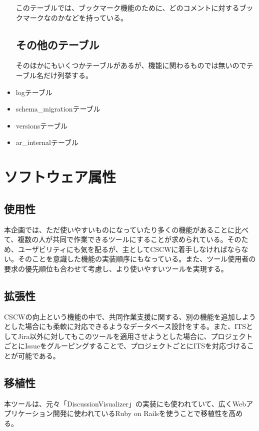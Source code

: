 \documentclass[12pt, oneside]{jreport}
\begin{document}
\begin{itemize}
		このテーブルでは、ブックマーク機能のために、どのコメントに対するブックマークなのかなどを持っている。
		
		\subsection{その他のテーブル}
		
		そのほかにもいくつかテーブルがあるが、機能に関わるものでは無いのでテーブル名だけ列挙する。
		
		\item logテーブル
		\item schema\_migrationテーブル
		\item versionsテーブル
		\item ar\_internalテーブル
		
	\end{itemize}
	
	\section{ソフトウェア属性}
	
		\subsection{使用性}
		本企画では、ただ使いやすいものになっていたり多くの機能があることに比べて、複数の人が共同で作業できるツールにすることが求められている。そのため、ユーザビリティにも気を配るが、主としてCSCWに着手しなければならない。そのことを意識した機能の実装順序にもなっている。また、ツール使用者の要求の優先順位も合わせて考慮し、より使いやすいツールを実現する。
		
		\subsection{拡張性}
		CSCWの向上という機能の中で、共同作業支援に関する、別の機能を追加しようとした場合にも柔軟に対応できるようなデータベース設計をする。また、ITSとしてJira以外に対してもこのツールを適用させようとした場合に、プロジェクトごとにIssueをグルーピングすることで、プロジェクトごとにITSを対応づけることが可能である。
		
		\subsection{移植性}
		本ツールは、元々「DiscussionVisualizer」の実装にも使われていて、広くWebアプリケーション開発に使われているRuby on Railsを使うことで移植性を高める。
\end{document}

